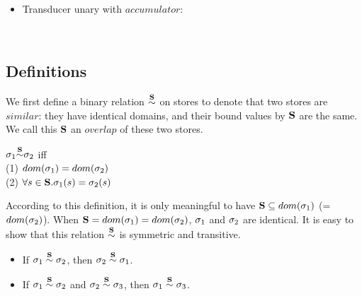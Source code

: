 \begin{itemize}
\begin{mdframed}
\begin{itemize}
\\[2ex]


\item Transducer unary with $accumulator$: \\


 \\


\end{itemize}
\end{mdframed}


\end{itemize}





\subsection{Definitions}
We first define a binary relation $\~\S$ on stores to denote that two stores are $similar$: they have identical domains, and their bound values by $\S$ are the same. 
We call this $\S$ an $overlap$ of these two stores.

\begin{defi}
	\label{def-sgm-sim}
	
	$\sgm_1 {\~{\S}} \sgm_2 $
	iff \\
	(1) $dom(\sgm_1) = dom(\sgm_2)$ \\
	(2) $\forall s \in \S.\sgm_1(s)= \sgm_2(s)$ \\
\end{defi}

According to this definition, it is only meaningful to have $\S  \subseteq dom(\sgm_1)$ (= $dom(\sgm_2)$).  
When $\S = dom(\sgm_1) = dom(\sgm_2)$, $\sgm_1$ and $\sgm_2$ are identical. 
It is easy to show that this relation $\overset{\S}{\sim}$ is symmetric and transitive.
\begin{itemize}
	\item If $\sgm_1 \~\S \sgm_2$, then $\sgm_2 \~\S \sgm_1$.
	\item If $\sgm_1 \~\S \sgm_2$ and $\sgm_2 \~\S \sgm_3$, then $\sgm_1 \~\S \sgm_3$.
\end{itemize}


